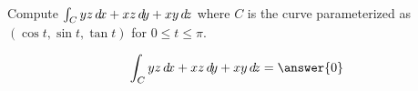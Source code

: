 \documentclass{ximera}
\author{David Guichard \and Neal Koblitz \and H. Jerome Keisler \and Albert Scheller \and Barry Balof \and Mike Wills \and Matthew Carr}
\begin{document}
\begin{exercise}





Compute $\int_C yz\mathop{}\!d\! x+xz \mathop{}\!d\! y+xy\mathop{}\!d\! z$ where $C$ is the curve parameterized as $(\cos t,\sin t,\tan t)$ for $0\le t\le \pi $.

\begin{prompt}
\[
\int_C yz\d x+xz \d y+xy\d z=\answer{0}
\]
\end{prompt}



\end{exercise}
\end{document}
